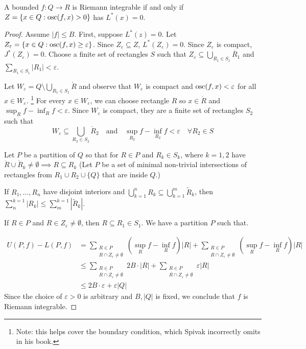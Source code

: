 \begin{theorem}
  A bounded $f : Q \to R$ is Riemann integrable if and only if $Z = \{ x \in Q : \operatorname*{osc} (f,x) > 0 \}$ has $L^*(x) = 0$.
\end{theorem}

\begin{proof}
  Assume $|f| \leq B$. First, suppose $L^*(z) = 0$.
  Let $Z_\varepsilon = \{ x \in Q : \operatorname*{osc} (f,x) \geq \varepsilon\}$.
  Since $Z_\varepsilon \subseteq Z$, $L^*(Z_\varepsilon) = 0$.
  Since $Z_\varepsilon$ is compact, $J^*(Z_\varepsilon) = 0$.
  Choose a finite set of rectangles $S$ such that $Z_\varepsilon \subseteq \bigcup_{R_1 \in S_1} \mathring{R_1}$ and $\sum_{R_1 \in S_1} |R_1| < \varepsilon$.

  Let $W_\varepsilon = Q \setminus \bigcup_{R_1 \in S_1} \mathring{R}$ and observe that $W_\varepsilon$ is compact and $\operatorname*{osc}(f,x) < \varepsilon$ for all $x \in W_\varepsilon$.
  \footnote{Note: this helps cover the boundary condition, which Spivak incorrectly omits in his book.}
  For every $x \in W_\varepsilon$, we can choose rectangle $R$ so $x \in \mathring{R}$ and $\sup_R f - \inf_R f < \varepsilon$.
  Since $W_\varepsilon$ is compact, they are a finite set of rectangles $S_2$ such that
  \[ W_\varepsilon \subseteq \bigcup_{R_2 \in S_2} \mathring{R}_2 \quad \text{and} \quad \sup_{R_2} f - \inf_{R_2} f < \varepsilon \quad \forall R_2 \in S \]

  Let $P$ be a partition of $Q$ so that for $R \in P$ and $R_k \in S_k$, where $k = 1,2$ have $\mathring{R} \cup \mathring{R}_k \ne \emptyset \implies R \subseteq R_k$
  (Let $P$ be a set of minimal non-trivial intersections of rectangles from $R_1 \cup R_2 \cup \{ Q \}$ that are inside $Q$.)

  \begin{lemma}
  If $R_1, \ldots, R_n$ have disjoint interiors and $\bigcup^n_{k=1} R_k \subseteq \bigcup^m_{k=1} \tilde{R}_k$, then $\sum_{n}^{k=1} |R_k| \leq \sum_{m}^{k=1} |\tilde{R}_k|$.
  \end{lemma}

  If $R \in P$ and $R \in Z_\varepsilon \ne \emptyset$, then $R \subseteq R_1 \in S_1$.
  We have a partition $P$ such that.

  \begin{align*}
    U(P,f) - L(P,f) & = \sum_{\substack{R \in P \\ R \cap Z_\varepsilon \ne \emptyset}} \left( \sup_R f - \inf_R f \right) |R| + \sum_{\substack{R \in P \\ R \cap Z_\varepsilon \ne \emptyset}} \left( \sup_R f - \inf_R f \right) |R| \\
                    & \leq \sum_{\substack{R \in P \\ R \cap Z_\varepsilon \ne \emptyset}} 2B \cdot |R| + \sum_{\substack{R \in P \\ R \cap Z_\varepsilon \ne \emptyset}} \varepsilon |R| \\
                    & \leq 2B \cdot \varepsilon + \varepsilon |Q|
  \end{align*}
  Since the choice of $\varepsilon > 0$ is arbitrary and $B, |Q|$ is fixed, we conclude that $f$ is Riemann integrable.


\end{proof}
